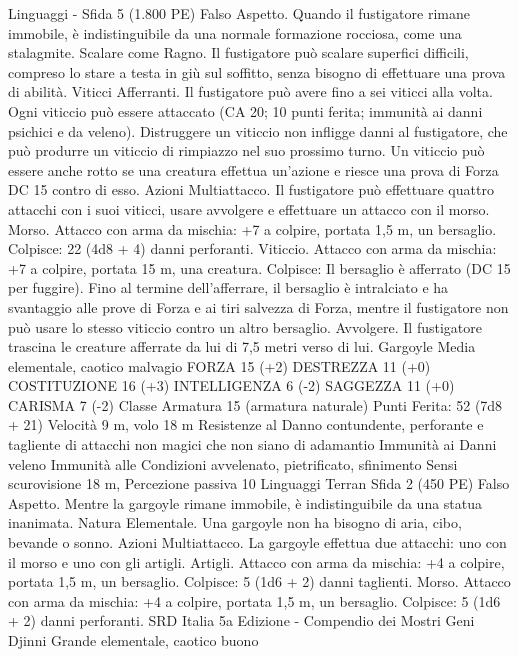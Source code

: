 \begin{multicols}{2}
Linguaggi -
Sfida 5 (1.800 PE)
Falso Aspetto. Quando il fustigatore rimane immobile, è
indistinguibile da una normale formazione rocciosa, come una
stalagmite.
Scalare come Ragno. Il fustigatore può scalare superfici difficili,
compreso lo stare a testa in giù sul soffitto, senza bisogno di
effettuare una prova di abilità.
Viticci Afferranti. Il fustigatore può avere fino a sei viticci alla
volta. Ogni viticcio può essere attaccato (CA 20; 10 punti ferita;
immunità ai danni psichici e da veleno). Distruggere un viticcio
non infligge danni al fustigatore, che può produrre un viticcio di
rimpiazzo nel suo prossimo turno. Un viticcio può essere anche
rotto se una creatura effettua un’azione e riesce una prova di
Forza DC 15 contro di esso.
Azioni
Multiattacco. Il fustigatore può effettuare quattro attacchi con i
suoi viticci, usare avvolgere e effettuare un attacco con il morso.
Morso. Attacco con arma da mischia: +7 a colpire, portata 1,5
m, un bersaglio.
Colpisce: 22 (4d8 + 4) danni perforanti.
Viticcio. Attacco con arma da mischia: +7 a colpire, portata 15
m, una creatura.
Colpisce: Il bersaglio è afferrato (DC 15 per fuggire). Fino al
termine dell’afferrare, il bersaglio è intralciato e ha svantaggio
alle prove di Forza e ai tiri salvezza di Forza, mentre il
fustigatore non può usare lo stesso viticcio contro un altro
bersaglio.
Avvolgere. Il fustigatore trascina le creature afferrate da lui di 7,5
metri verso di lui.
Gargoyle
Media elementale, caotico malvagio
FORZA 15 (+2)
DESTREZZA 11 (+0)
COSTITUZIONE 16 (+3)
INTELLIGENZA 6 (-2)
SAGGEZZA 11 (+0)
CARISMA 7 (-2)
Classe Armatura 15 (armatura naturale)
\hspace*{0pt}\hfill{Punti Ferita}: 52 (7d8 + 21)
Velocità 9 m, volo 18 m
Resistenze al Danno contundente, perforante e tagliente di
attacchi non magici che non siano di adamantio
Immunità ai Danni veleno
Immunità alle Condizioni avvelenato, pietrificato, sfinimento
Sensi scurovisione 18 m, Percezione passiva 10
Linguaggi Terran
Sfida 2 (450 PE)
Falso Aspetto. Mentre la gargoyle rimane immobile, è
indistinguibile da una statua inanimata.
Natura Elementale. Una gargoyle non ha bisogno di aria, cibo,
bevande o sonno.
Azioni
Multiattacco. La gargoyle effettua due attacchi: uno con il morso
e uno con gli artigli.
Artigli. Attacco con arma da mischia: +4 a colpire, portata 1,5
m, un bersaglio.
Colpisce: 5 (1d6 + 2) danni taglienti.
Morso. Attacco con arma da mischia: +4 a colpire, portata 1,5
m, un bersaglio.
Colpisce: 5 (1d6 + 2) danni perforanti.
SRD Italia 5a Edizione - Compendio dei Mostri
Geni
Djinni
Grande elementale, caotico buono

\end{multicols}
